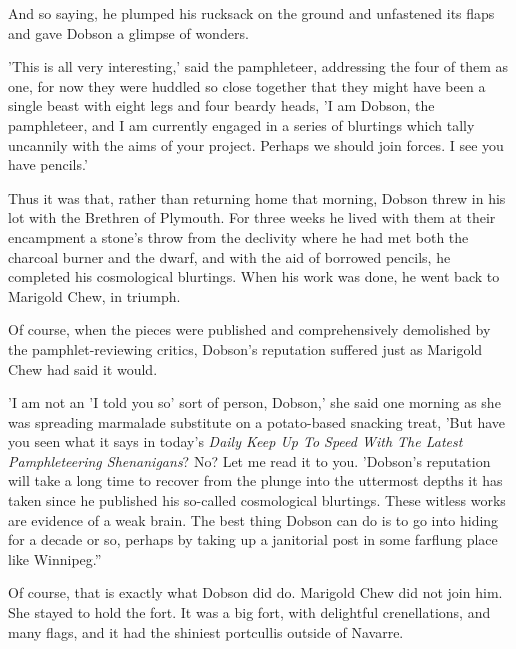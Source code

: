 And so saying, he plumped his rucksack on the ground and unfastened its flaps and gave Dobson a glimpse of wonders.

'This is all very interesting,' said the pamphleteer, addressing the four of them as one, for now they were huddled so close together that they might have been a single beast with eight legs and four beardy heads, 'I am Dobson, the pamphleteer, and I am currently engaged in a series of blurtings which tally uncannily with the aims of your project. Perhaps we should join forces. I see you have pencils.'

Thus it was that, rather than returning home that morning, Dobson threw in his lot with the Brethren of Plymouth. For three weeks he lived with them at their encampment a stone's throw from the declivity where he had met both the charcoal burner and the dwarf, and with the aid of borrowed pencils, he completed his cosmological blurtings. When his work was done, he went back to Marigold Chew, in triumph.

Of course, when the pieces were published and comprehensively demolished by the pamphlet-reviewing critics, Dobson's reputation suffered just as Marigold Chew had said it would.

'I am not an 'I told you so' sort of person, Dobson,' she said one morning as she was spreading marmalade substitute on a potato-based snacking treat, 'But have you seen what it says in today's \emph{Daily Keep Up To Speed With The Latest Pamphleteering Shenanigans}? No? Let me read it to you. 'Dobson's reputation will take a long time to recover from the plunge into the uttermost depths it has taken since he published his so-called cosmological blurtings. These witless works are evidence of a weak brain. The best thing Dobson can do is to go into hiding for a decade or so, perhaps by taking up a janitorial post in some farflung place like Winnipeg.''

Of course, that is exactly what Dobson did do. Marigold Chew did not join him. She stayed to hold the fort. It was a big fort, with delightful crenellations, and many flags, and it had the shiniest portcullis outside of Navarre.